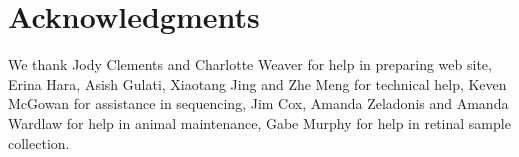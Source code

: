 \section{Acknowledgments}
We thank Jody Clements and Charlotte Weaver for help in preparing web site, Erina Hara, Asish Gulati, Xiaotang Jing and Zhe Meng for technical help, Keven McGowan for assistance in sequencing, Jim Cox, Amanda Zeladonis and Amanda Wardlaw for help in animal maintenance, Gabe Murphy for help in retinal sample collection.